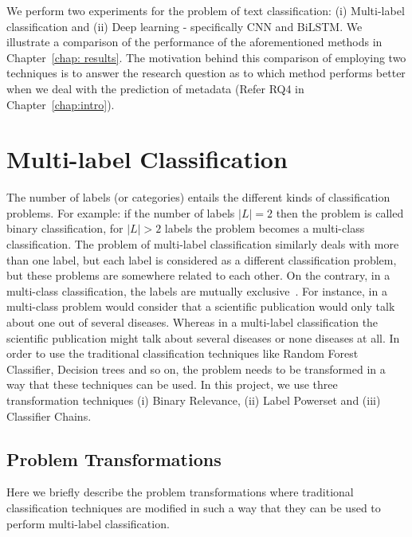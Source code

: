 We perform two experiments for the problem of text classification: (i) Multi-label classification and (ii) Deep learning - specifically CNN and BiLSTM. We illustrate a comparison of the performance of the aforementioned methods in Chapter~\ref{chap: results}. The motivation behind this comparison of employing two techniques is to answer the research question as to which method performs better when we deal with the prediction of metadata (Refer RQ4 in Chapter~\ref{chap:intro}).

\section{Multi-label Classification}\label{MLtranform}
The number of labels (or categories) entails the different kinds of classification problems. For example: if the number of labels $|L| = 2$ then the problem is called binary classification, for $|L| > 2$ labels the problem becomes a multi-class classification. The problem of multi-label classification similarly deals with more than one label, but each label is considered as a different classification problem, but these problems are somewhere related to each other. On the contrary, in a multi-class classification, the labels are mutually exclusive~\cite{tsoumakas2007multi}. For instance, in a multi-class problem would consider that a scientific publication would only talk about one out of several diseases. Whereas in a multi-label classification the scientific publication might talk about several diseases or none diseases at all. 
In order to use the traditional classification techniques like Random Forest Classifier, Decision trees and so on, the problem needs to be transformed in a way that these techniques can be used. In this project, we use three transformation techniques (i) Binary Relevance, (ii) Label Powerset and (iii) Classifier Chains. 
\subsection{Problem Transformations}
Here we briefly describe the problem transformations where traditional classification techniques are modified in such a way that they can be used to perform multi-label classification. 
